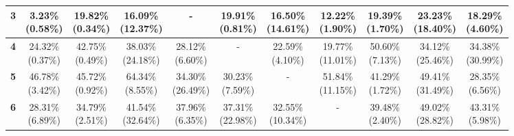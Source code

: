\documentclass{report}
\begin{document}
\begin{center}
{\begin{tabular}{|c|c|c|c|c|c|c|c|c|c|c|}
  \textbf{3} & \makecell{3.23\% \\ (0.58\%)} & \makecell{19.82\% \\ (0.34\%)} & \makecell{16.09\% \\ (12.37\%)} & - & \makecell{19.91\% \\ (0.81\%)} & \makecell{16.50\% \\ (14.61\%)} & \makecell{12.22\% \\ (1.90\%)} & \makecell{19.39\% \\ (1.70\%)} & \makecell{23.23\% \\ (18.40\%)} & \makecell{18.29\% \\ (4.60\%)} \\ \hline
  \textbf{4} & \makecell{24.32\% \\ (0.37\%)} & \makecell{42.75\% \\ (0.49\%)} & \makecell{38.03\% \\ (24.18\%)} & \makecell{28.12\% \\ (6.60\%)} & - & \makecell{22.59\% \\ (4.10\%)} & \makecell{19.77\% \\ (11.01\%)} & \makecell{50.60\% \\ (7.13\%)} & \makecell{34.12\% \\ (25.46\%)} & \makecell{34.38\% \\ (30.99\%)} \\ \hline
  \textbf{5} & \makecell{46.78\% \\ (3.42\%)} & \makecell{45.72\% \\ (0.92\%)} & \makecell{64.34\% \\ (8.55\%)} & \makecell{34.30\% \\ (26.49\%)} & \makecell{30.23\% \\ (7.59\%)} & - & \makecell{51.84\% \\ (11.15\%)} & \makecell{41.29\% \\ (1.72\%)} & \makecell{49.41\% \\ (31.49\%)} & \makecell{28.35\% \\ (6.56\%)} \\ \hline
  \textbf{6} & \makecell{28.31\% \\ (6.89\%)} & \makecell{34.79\% \\ (2.51\%)} & \makecell{41.54\% \\ (32.64\%)} & \makecell{37.96\% \\ (6.35\%)} & \makecell{37.31\% \\ (22.98\%)} & \makecell{32.55\% \\ (10.34\%)} & - & \makecell{39.48\% \\ (2.40\%)} & \makecell{49.02\% \\ (28.82\%)} & \makecell{43.31\% \\ (5.98\%)} \\ \hline

\end{tabular}}
\end{center}
\end{document}
